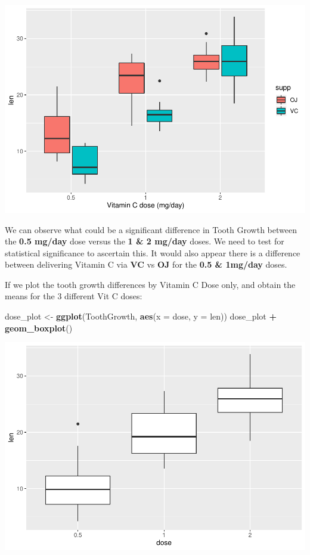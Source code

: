 \documentclass[]{article}
\newenvironment{Shaded}{\begin{snugshade}}{\end{snugshade}}
\newcommand{\DataTypeTok}[1]{\textcolor[rgb]{0.13,0.29,0.53}{#1}}
\newcommand{\KeywordTok}[1]{\textcolor[rgb]{0.13,0.29,0.53}{\textbf{#1}}}
\newcommand{\NormalTok}[1]{#1}
\newcommand{\OperatorTok}[1]{\textcolor[rgb]{0.81,0.36,0.00}{\textbf{#1}}}
\newcommand{\StringTok}[1]{\textcolor[rgb]{0.31,0.60,0.02}{#1}}
\begin{document}
\includegraphics{Statistical-Inference-Assigment---Part-2---Final_files/figure-latex/unnamed-chunk-3-1.pdf}

We can observe what could be a significant difference in Tooth Growth
between the \textbf{0.5 mg/day} dose versus the \textbf{1 \& 2 mg/day}
doses. We need to test for statistical significance to ascertain this.
It would also appear there is a difference between delivering Vitamin C
via \textbf{VC} vs \textbf{OJ} for the \textbf{0.5 \& 1mg/day} doses.

\break

If we plot the tooth growth differences by Vitamin C Dose only, and
obtain the means for the 3 different Vit C doses:

\begin{Shaded}
\begin{Highlighting}[]
\NormalTok{dose_plot <-}\StringTok{ }\KeywordTok{ggplot}\NormalTok{(ToothGrowth, }\KeywordTok{aes}\NormalTok{(}\DataTypeTok{x =}\NormalTok{ dose, }\DataTypeTok{y =}\NormalTok{ len))}
\NormalTok{dose_plot }\OperatorTok{+}\StringTok{ }\KeywordTok{geom_boxplot}\NormalTok{()}
\end{Highlighting}
\end{Shaded}

\includegraphics{Statistical-Inference-Assigment---Part-2---Final_files/figure-latex/unnamed-chunk-4-1.pdf}
\end{document}
